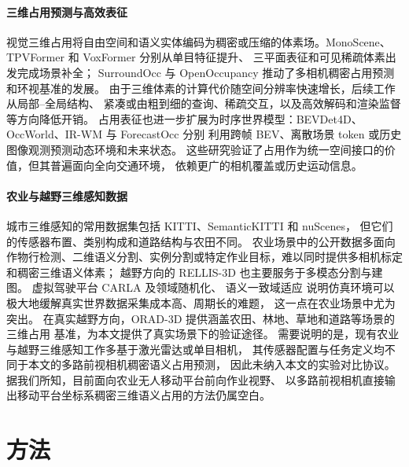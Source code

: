\documentclass[a4paper,fleqn]{cas-sc}
\begin{document}
\paragraph{三维占用预测与高效表征}
视觉三维占用将自由空间和语义实体编码为稠密或压缩的体素场。MonoScene、TPVFormer 和 VoxFormer 分别从单目特征提升、
三平面表征和可见稀疏体素出发完成场景补全\citep{cao2022monoscene,huang2023tpvformer,li2023voxformer}；
SurroundOcc 与 OpenOccupancy 推动了多相机稠密占用预测和环视基准的发展\citep{wei2023surroundocc,wang2023openoccupancy}。
由于三维体素的计算代价随空间分辨率快速增长，后续工作从局部--全局结构、
紧凑或由粗到细的查询、稀疏交互，以及高效解码和渲染监督等方向降低开销\citep{zhang2023occformer,ma2024cotr,wang2024panoocc,liu2024sparseocc,tang2024sparseocc,yu2023flashocc,pan2024renderocc}。
占用表征也进一步扩展为时序世界模型：BEVDet4D、OccWorld、IR-WM 与 ForecastOcc 分别
利用跨帧 BEV、离散场景 token 或历史图像观测预测动态环境和未来状态\citep{huang2022bevdet4d,zheng2024occworld,mei2025irwm,mohan2026forecastocc}。
这些研究验证了占用作为统一空间接口的价值，但其普遍面向全向交通环境，
依赖更广的相机覆盖或历史运动信息。

\paragraph{农业与越野三维感知数据}
城市三维感知的常用数据集包括 KITTI\citep{geiger2012kitti}、SemanticKITTI\citep{behley2019semantickitti} 和 nuScenes\citep{caesar2020nuscenes}，
但它们的传感器布置、类别构成和道路结构与农田不同。
农业场景中的公开数据多面向作物行检测、二维语义分割、实例分割或特定作业目标，难以同时提供多相机标定和稠密三维语义体素；
越野方向的 RELLIS-3D\citep{jiang2020rellis} 也主要服务于多模态分割与建图。
虚拟驾驶平台 CARLA\citep{dosovitskiy2017carla} 及领域随机化\citep{tobin2017domainrandomization,peng2018sim2real}、
语义一致域适应\citep{hoffman2018cycada} 说明仿真环境可以极大地缓解真实世界数据采集成本高、周期长的难题，
这一点在农业场景中尤为突出。
在真实越野方向，ORAD-3D 提供涵盖农田、林地、草地和道路等场景的三维占用
基准\citep{chen2025orad3d}，为本文提供了真实场景下的验证途径。
需要说明的是，现有农业与越野三维感知工作多基于激光雷达或单目相机，
其传感器配置与任务定义均不同于本文的多路前视相机稠密语义占用预测，
因此未纳入本文的实验对比协议。据我们所知，目前面向农业无人移动平台前向作业视野、
以多路前视相机直接输出移动平台坐标系稠密三维语义占用的方法仍属空白。
\section{方法}\label{sec:method}
\end{document}
